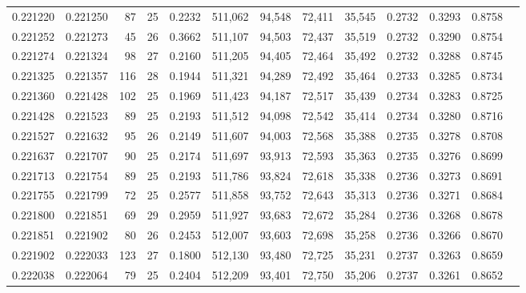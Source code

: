 \begin{tabular}{rrrrrrrrrrrrr}
0.221220 & 0.221250 &  87 &  25 &                                     0.2232 & 511,062 &  94,548 &  72,411 &  35,545 & 0.2732 & 0.3293 & 0.8758 \\
0.221252 & 0.221273 &  45 &  26 &                                     0.3662 & 511,107 &  94,503 &  72,437 &  35,519 & 0.2732 & 0.3290 & 0.8754 \\
0.221274 & 0.221324 &  98 &  27 &                                     0.2160 & 511,205 &  94,405 &  72,464 &  35,492 & 0.2732 & 0.3288 & 0.8745 \\
0.221325 & 0.221357 & 116 &  28 &                                     0.1944 & 511,321 &  94,289 &  72,492 &  35,464 & 0.2733 & 0.3285 & 0.8734 \\
0.221360 & 0.221428 & 102 &  25 &                                     0.1969 & 511,423 &  94,187 &  72,517 &  35,439 & 0.2734 & 0.3283 & 0.8725 \\
0.221428 & 0.221523 &  89 &  25 &                                     0.2193 & 511,512 &  94,098 &  72,542 &  35,414 & 0.2734 & 0.3280 & 0.8716 \\
0.221527 & 0.221632 &  95 &  26 &                                     0.2149 & 511,607 &  94,003 &  72,568 &  35,388 & 0.2735 & 0.3278 & 0.8708 \\
0.221637 & 0.221707 &  90 &  25 &                                     0.2174 & 511,697 &  93,913 &  72,593 &  35,363 & 0.2735 & 0.3276 & 0.8699 \\
0.221713 & 0.221754 &  89 &  25 &                                     0.2193 & 511,786 &  93,824 &  72,618 &  35,338 & 0.2736 & 0.3273 & 0.8691 \\
0.221755 & 0.221799 &  72 &  25 &                                     0.2577 & 511,858 &  93,752 &  72,643 &  35,313 & 0.2736 & 0.3271 & 0.8684 \\
0.221800 & 0.221851 &  69 &  29 &                                     0.2959 & 511,927 &  93,683 &  72,672 &  35,284 & 0.2736 & 0.3268 & 0.8678 \\
0.221851 & 0.221902 &  80 &  26 &                                     0.2453 & 512,007 &  93,603 &  72,698 &  35,258 & 0.2736 & 0.3266 & 0.8670 \\
0.221902 & 0.222033 & 123 &  27 &                                     0.1800 & 512,130 &  93,480 &  72,725 &  35,231 & 0.2737 & 0.3263 & 0.8659 \\
0.222038 & 0.222064 &  79 &  25 &                                     0.2404 & 512,209 &  93,401 &  72,750 &  35,206 & 0.2737 & 0.3261 & 0.8652 \\

\end{tabular}
